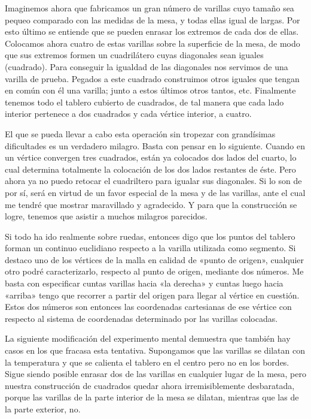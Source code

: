 \documentclass[spanish]{book}
\begin{document}
Imaginemos ahora que fabricamos un gran número de varillas cuyo tamaño sea
pequeo comparado con las medidas de la mesa, y todas ellas igual de largas. Por esto
último se entiende que se pueden enrasar los extremos de cada dos de ellas.
Colocamos ahora cuatro de estas varillas sobre la superficie de la mesa, de modo que
sus extremos formen un cuadrilátero cuyas diagonales sean iguales (cuadrado). Para
conseguir la igualdad de las diagonales nos servimos de una varilla de prueba. Pegados
a este cuadrado construimos otros iguales que tengan en común con él una varilla;
junto a estos últimos otros tantos, etc. Finalmente tenemos todo el tablero cubierto
de cuadrados, de tal manera que cada lado interior pertenece a dos cuadrados y
cada vértice interior, a cuatro.

El que se pueda llevar a cabo esta operación sin tropezar con grandísimas dificultades
es un verdadero milagro. Basta con pensar en lo siguiente. Cuando en un vértice
convergen tres cuadrados, están ya colocados dos lados del cuarto, lo cual determina
totalmente la colocación de los dos lados restantes de éste. Pero ahora ya no puedo
retocar el cuadriltero para igualar sus diagonales. Si lo son de por sí, será en virtud de
un favor especial de la mesa y de las varillas, ante el cual me tendré que mostrar
maravillado y agradecido. Y para que la construcción se logre, tenemos que asistir a
muchos milagros parecidos.

Si todo ha ido realmente sobre ruedas, entonces digo que los puntos del tablero
forman un continuo euclidiano respecto a la varilla utilizada como segmento. Si
destaco uno de los vértices de la malla en calidad de «punto de origen», cualquier otro
podré caracterizarlo, respecto al punto de origen, mediante dos números. Me basta
con especificar cuntas varillas hacia «la derecha» y cuntas luego hacia «arriba» tengo
que recorrer a partir del origen para llegar al vértice en cuestión. Estos dos números
son entonces las coordenadas cartesianas de ese vértice con respecto al sistema de
coordenadas determinado por las varillas colocadas.

La siguiente modificación del experimento mental demuestra que también hay
casos en los que fracasa esta tentativa. Supongamos que las varillas se dilatan con la
temperatura y que se calienta el tablero en el centro pero no en los bordes. Sigue
siendo posible enrasar dos de las varillas en cualquier lugar de la mesa, pero nuestra
construcción de cuadrados quedar ahora irremisiblemente desbaratada, porque las
varillas de la parte interior de la mesa se dilatan, mientras que las de la parte exterior,
no.
\end{document}
